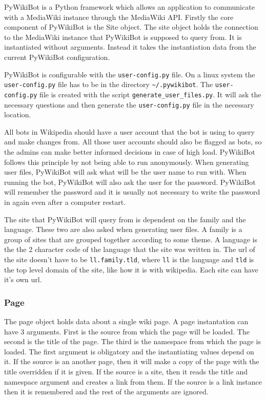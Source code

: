 PyWikiBot is a Python framework which allows an application to communicate with
a MediaWiki instance through the MediaWiki API. Firstly the core component of
PyWikiBot is the Site object. The site object holds the connection to the
MediaWiki instance that PyWikiBot is supposed to query from. It is instantiated
without arguments. Instead it takes the instantiation data from the current
PyWikiBot configuration.

PyWikiBot is configurable with the \verb;user-config.py; file. On a linux system
the \verb;user-config.py; file has to be in the directory \verb;~/.pywikibot;.
The \verb;user-config.py; file is created with the script
\verb;generate_user_files.py;. It will ask the necessary questions and then
generate the \verb;user-config.py; file in the necessary location.

All bots in Wikipedia should have a user account that the bot is using to query
and make changes from. All those user accounts should also be flagged as bots,
so the admins can make better informed decisions in case of high load. PyWikiBot
follows this principle by not being able to run anonymously. When generating
user files, PyWikiBot will ask what will be the user name to run with. When
running the bot, PyWikiBot will also ask the user for the password. PyWikiBot
will remember the password and it is usually not necessary to write the password
in again even after a computer restart.

The site that PyWikiBot will query from is dependent on the family and the
language. These two are also asked when generating user files. A family is a
group of sites that are grouped together according to some theme. A language is
the the 2 character code of the language that the site was written in. The url
of the site doesn't have to be \verb;ll.family.tld;, where \verb;ll; is the
language and \verb;tld; is the top level domain of the site, like how it is with
wikipedia. Each site can have it's own url.

\subsubsection{Page}
The page object holds data about a single wiki page. A page instantation can
have 3 arguments. First is the source from which the page will be loaded. The
second is the title of the page. The third is the namespace from which the page
is loaded. The first argument is obligatory and the instantiating values depend
on it. If the source is an another page, then it will make a copy of the page
with the title overridden if it is given. If the source is a site, then it reads
the title and namespace argument and creates a link from them. If the source is
a link instance then it is remembered and the rest of the arguments are ignored.

